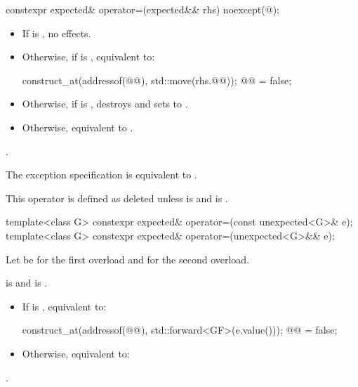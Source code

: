 %
\begin{itemdecl}
constexpr expected& operator=(expected&& rhs) noexcept(@\seebelow@);
\end{itemdecl}

\begin{itemdescr}
\pnum
\effects
\begin{itemize}
\item
If  is , no effects.
\item
Otherwise, if  is , equivalent to:
\begin{codeblock}
construct_at(addressof(@@), std::move(rhs.@@));
@@ = false;
\end{codeblock}
\item
Otherwise, if  is ,
destroys  and sets  to .
\item
Otherwise, equivalent to .
\end{itemize}

\pnum
\returns
{}.

\pnum
\remarks
The exception specification is equivalent to
.

\pnum
This operator is defined as deleted unless
 is  and
 is .
\end{itemdescr}

%
\begin{itemdecl}
template<class G>
  constexpr expected& operator=(const unexpected<G>& e);
template<class G>
  constexpr expected& operator=(unexpected<G>&& e);
\end{itemdecl}

\begin{itemdescr}
\pnum
Let  be  for the first overload and
 for the second overload.

\pnum
\constraints
{} is  and
 is .

\pnum
\effects
\begin{itemize}
\item
If  is , equivalent to:
\begin{codeblock}
construct_at(addressof(@@), std::forward<GF>(e.value()));
@@ = false;
\end{codeblock}
\item
Otherwise, equivalent to:
\end{itemize}

\pnum
\returns
{}.
\end{itemdescr}

